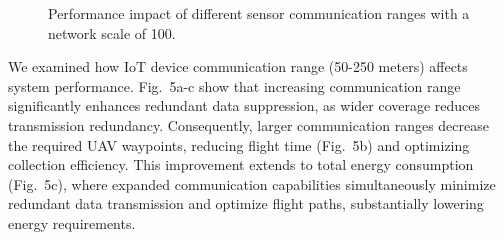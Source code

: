 \documentclass[sigconf]{acmart}
\begin{document}
\begin{figure}[htbp]
	\centering
	\hfill
	\hfill
	\caption{Performance impact of different sensor communication ranges with a network scale of 100.}
	\label{location} %
\end{figure}

We examined how IoT device communication range (50-250 meters) affects system performance. Fig.~5a-c show that increasing communication range significantly enhances redundant data suppression, as wider coverage reduces transmission redundancy. Consequently, larger communication ranges decrease the required UAV waypoints, reducing flight time (Fig.~5b) and optimizing collection efficiency. This improvement extends to total energy consumption (Fig.~5c), where expanded communication capabilities simultaneously minimize redundant data transmission and optimize flight paths, substantially lowering energy requirements.
\end{document}
